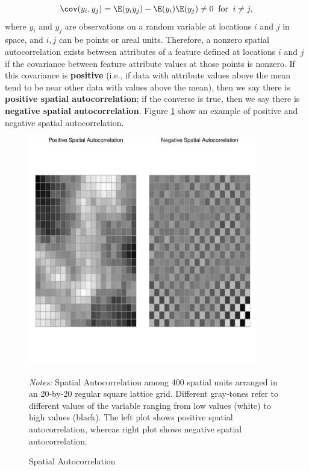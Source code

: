 \documentclass[english,12pt]{book}\usepackage[]{graphicx}\usepackage[]{xcolor}
\newenvironment{knitrout}{}{} %
\begin{document}
\begin{equation*}
  \cov(y_i, y_j) = \E(y_iy_j) - \E(y_i)\E(y_j)\neq 0\;\;\mbox{for}\;\; i \neq j,
\end{equation*}
%
where $y_i$ and $y_j$ are observations on a random variable at locations $i$ and $j$ in space, and $i,j$ can be points or areal units. Therefore, a nonzero spatial autocorrelation exists between attributes of a feature defined at locations $i$ and $j$ if the covariance between feature attribute values at those points is nonzero. If this covariance is \textbf{positive} (i.e., if data with attribute values above the mean tend to be near other data with values above the mean), then we say there is \textbf{positive spatial autocorrelation}; if the converse is true, then we say there is \textbf{negative spatial autocorrelation}. Figure \ref{fig:Autocorrelation} show an example of positive and negative spatial autocorrelation. 

\begin{figure}[ht]
  \caption{Spatial Autocorrelation}
    \label{fig:Autocorrelation}
    \centering
    	\begin{minipage}{1\linewidth}
\begin{knitrout}
\color{fgcolor}

{\centering \includegraphics[width=10cm,height=10cm]{figure/Autocorrelation-1} 

}


\end{knitrout}
\footnotesize
		\emph{Notes:} Spatial Autocorrelation among 400 spatial units arranged in an 20-by-20 regular square lattice grid. Different gray-tones refer to different values of the variable ranging from low values (white) to high values (black). The left plot shows positive spatial autocorrelation, whereas right plot shows negative spatial autocorrelation. 
	\end{minipage}	
\end{figure}
\end{document}
